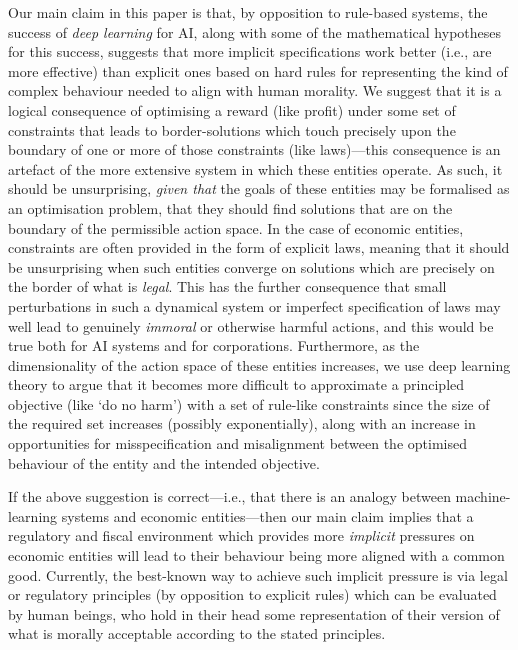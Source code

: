 \documentclass{amsart}
\theoremstyle{indented}
\theoremstyle{indentedProp}
\theoremstyle{indented}
\theoremstyle{indented}
\theoremstyle{indented}
\theoremstyle{indented}
\theoremstyle{indented}
\begin{document}
Our main claim in this paper is that, by opposition to rule-based systems, the success of {\it deep learning} for AI, along with some of the mathematical hypotheses for this success, suggests that more implicit specifications work better (i.e., are more effective) than explicit ones based on hard rules for representing the kind of complex behaviour needed to align with human morality. We suggest that it is a logical consequence of optimising a reward (like profit) under some set of constraints that leads to border-solutions which touch precisely upon the boundary of one or more of those constraints (like laws)---this consequence is an artefact of the more extensive system in which these entities operate. As such, it should be unsurprising, {\it given that} the goals of these entities may be formalised as an optimisation problem, that they should find solutions that are on the boundary of the permissible action space. In the case of economic entities, constraints are often provided in the form of explicit laws, meaning that it should be unsurprising when such entities converge on solutions which are precisely on the border of what is {\it legal}. This has the further consequence that small perturbations in such a dynamical system or imperfect specification of laws may well lead to genuinely {\it immoral} or otherwise harmful actions, and this would be true both for AI systems and for corporations. Furthermore, as the dimensionality of the action space of these entities increases, we use deep learning theory to argue that it becomes more difficult to approximate a principled objective (like `do no harm') with a set of rule-like constraints since the size of the required set increases (possibly exponentially), along with an increase in opportunities for misspecification and misalignment between the optimised behaviour of the entity and the intended objective.

If the above suggestion is correct---i.e., that there is an analogy between machine-learning systems and economic entities---then our main claim implies that a regulatory and fiscal environment which provides more {\it implicit} pressures on economic entities will lead to their behaviour being more aligned with a common good. Currently, the best-known way to achieve such implicit pressure is via legal or regulatory principles (by opposition to explicit rules) which can be evaluated by human beings, who hold in their head some representation of their version of what is morally acceptable according to the stated principles.
\end{document}
